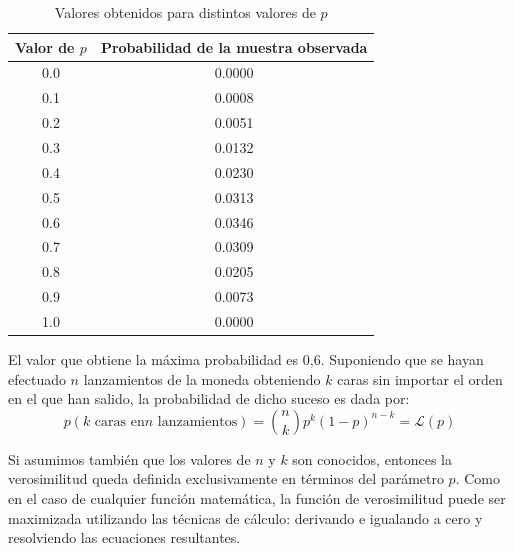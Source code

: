 \documentclass[a4paper]{article}
\begin{document}
\begin{table}[h]
\centering
\begin{tabular}{@{}cc@{}}
\toprule
\textbf{Valor de $p$} & \textbf{Probabilidad de la muestra observada} \\ \midrule
0.0                 & 0.0000                                        \\
0.1                 & 0.0008                                        \\
0.2                 & 0.0051                                        \\
0.3                 & 0.0132                                        \\
0.4                 & 0.0230                                        \\
0.5                 & 0.0313                                        \\
0.6                 & 0.0346                                        \\
0.7                 & 0.0309                                        \\
0.8                 & 0.0205                                         \\
0.9                 & 0.0073                                        \\
1.0                 & 0.0000                                        \\ \bottomrule
\end{tabular}
\caption{Valores obtenidos para distintos valores de $p$}
\label{tbl:ml}
\end{table}


El valor que obtiene la máxima probabilidad es 0,6.
Suponiendo que se hayan efectuado $n$ lanzamientos de la moneda obteniendo $k$ caras sin importar el orden en el que han salido, la probabilidad de dicho suceso es dada por:
\begin{equation}
p(k \text{ caras en} n \text{ lanzamientos}) = {n \choose k} p^k (1 - p)^{n-k} = \mathcal{L}(p)
\end{equation}



Si asumimos también que los valores de $n$ y $k$ son conocidos, entonces la verosimilitud queda definida exclusivamente en términos del parámetro $p$.
Como en el caso de cualquier función matemática, la función de verosimilitud puede ser maximizada utilizando las técnicas de cálculo: derivando e igualando a cero y resolviendo las ecuaciones resultantes.
\end{document}
